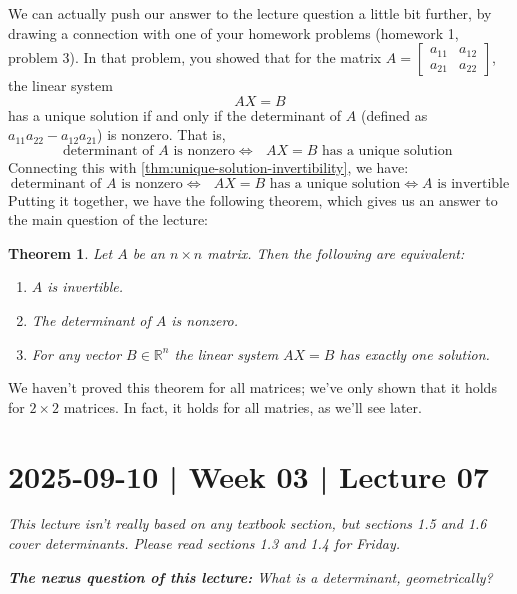 \documentclass[10pt]{article}
\newtheorem{theorem}{Theorem}
\theoremstyle{definition}
\newcommand{\R}{\mathbb{R}}           %
\begin{document}
We can actually push our answer to the lecture question a little bit further,
by drawing a connection with one of your homework problems (homework 1,
problem 3). In that problem, you showed that for the matrix $A=
\begin{bmatrix}
  a_{11}&a_{12}\\
  a_{21}&a_{22}
\end{bmatrix}
$, the linear system
\begin{equation*}
  AX=B
\end{equation*}
has a unique solution if and only if the determinant of $A$ (defined as
$a_{11}a_{22}-a_{12}a_{21}$) is nonzero. That is,
\begin{equation*}
  \text{determinant of $A$ is nonzero} \iff \text{ $AX=B$ has a unique solution }
\end{equation*}
Connecting this with \cref{thm:unique-solution-invertibility}, we have:
\begin{equation*}
  \text{determinant of $A$ is nonzero} \iff \text{ $AX=B$ has a unique solution} \iff
  \text{$A$ is invertible}
\end{equation*}
Putting it together, we have the following theorem, which gives us an answer
to the main question of the lecture:
\begin{theorem}
  \label{thm:key-theorem}
  Let $A$ be an $n\times n$ matrix. Then the following are equivalent:
  \begin{enumerate}[label=(\roman*.)]
    \item $A$ is invertible.
    \item The determinant of $A$ is nonzero.
    \item For any vector $B\in\R^{n}$ the linear system $AX=B$ has exactly one solution.
  \end{enumerate}
\end{theorem}
We haven't proved this theorem for all matrices; we've only shown that it
holds for $2\times 2$ matrices. In fact, it holds for all matries, as we'll
see later.


\newpage

\section{2025-09-10 | Week 03 | Lecture 07}

\textit{This lecture isn't really based on any textbook section, but sections
  1.5 and 1.6 cover determinants. Please read sections 1.3 and 1.4 for
  Friday.}

\begin{center}
  \begin{tcolorbox}[width=0.9\textwidth, colback=white, colframe=black]
    \textit{\textbf{The nexus question of this lecture:} What is a
      determinant, geometrically?}
  \end{tcolorbox}
\end{center}
\end{document}
